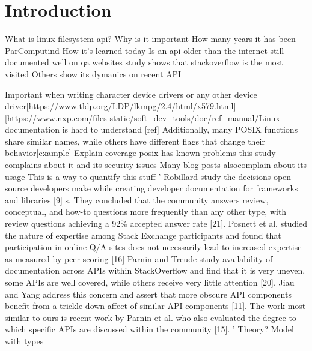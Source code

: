 \section{Introduction}

What is linux filesystem api?
Why is it important
How many years it has been ParComputind
How it's learned today
Is an api older than the internet still documented well on qa websites
study shows that stackoverflow is the most visited
Others show its dymanics on recent API

Important when writing character device drivers or any other device driver[https://www.tldp.org/LDP/lkmpg/2.4/html/x579.html]
[https://www.nxp.com/files-static/soft_dev_tools/doc/ref_manual/Linux%
documentation is hard to understand [ref]
Additionally, many POSIX functions share similar names, while others have different flags that change their behavior[example]
Explain coverage
posix has known problems
this study complains about it and its security issues
Many blog posts alsocomplain about its usage
This is a way to quantify this stuff
'
Robillard study the decisions open source developers make while creating
developer documentation for frameworks and libraries [9]
s. They concluded that the community answers review, conceptual,
and how-to questions more frequently than any other type, with review questions
achieving a 92\% accepted answer rate [21]. Posnett et al. studied the nature of expertise
among Stack Exchange participants and found that participation in online Q/A sites
does not necessarily lead to increased expertise as measured by peer scoring [16]
Parnin and Treude study availability of documentation
across APIs within StackOverflow and find that it is very uneven, some APIs are well
covered, while others receive very little attention [20]. Jiau and Yang address this concern
and assert that more obscure API components benefit from a trickle down affect of
similar API components [11].
The work most similar to ours is recent work by Parnin et al. who also evaluated
the degree to which specific APIs are discussed within the community [15].
'
Theory?
Model with types


